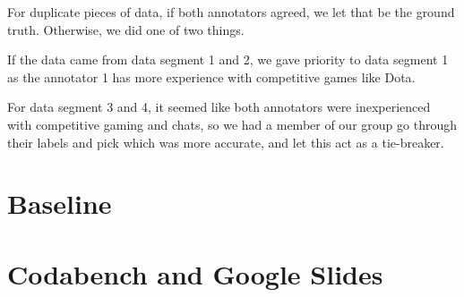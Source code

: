 \documentclass[11pt, letterpaper, notitlepage]{article}
\begin{document}
For duplicate pieces of data, if both annotators agreed, we let that be the ground truth. Otherwise, we did one of two things.

If the data came from data segment 1 and 2, we gave priority to data segment 1 as the annotator 1 has more experience with competitive games like Dota.

For data segment 3 and 4, it seemed like both annotators were inexperienced with competitive gaming and chats, so we had a member of our group go through their labels and pick which was more accurate, and let this act as a tie-breaker.

\section[3]{Baseline}

\section[4]{Codabench and Google Slides}
\end{document}
